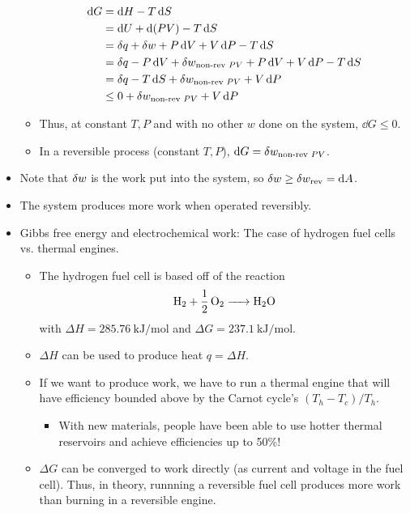 \documentclass[../notes.tex]{subfiles}
\begin{document}
\begin{itemize}
\begin{itemize}
        \begin{align*}
            \dd{G} &= \dd{H}-T\dd{S}\\
            &= \dd{U}+\dd{(PV)}-T\dd{S}\\
            &= \var{q}+\var{w}+P\dd{V}+V\dd{P}-T\dd{S}\\
            &= \var{q}-P\dd{V}+\var{w_{\text{non-rev }PV}}+P\dd{V}+V\dd{P}-T\dd{S}\\
            &= \var{q}-T\dd{S}+\var{w_{\text{non-rev }PV}}+V\dd{P}\\
            &\leq 0+\var{w_{\text{non-rev }PV}}+V\dd{P}
        \end{align*}
        \item Thus, at constant $T,P$ and with no other $w$ done on the system, $\dd{G}\leq 0$.
        \item In a reversible process (constant $T,P$), $\dd{G}=\var{w_{\text{non-rev }PV}}$.
    \end{itemize}
    \item Note that $\var{w}$ is the work put into the system, so $\var{w}\geq\var{w_\text{rev}}=\dd{A}$.
    \item The system produces more work when operated reversibly.
    \item Gibbs free energy and electrochemical work: The case of hydrogen fuel cells vs. thermal engines.
    \begin{itemize}
        \item The hydrogen fuel cell is based off of the reaction
        \begin{equation*}
            \ce{H2 + 1/2O2 -> H2O}
        \end{equation*}
        with $\Delta H=\SI[per-mode=symbol]{285.76}{\kilo\joule\per\mole}$ and $\Delta G=\SI[per-mode=symbol]{237.1}{\kilo\joule\per\mole}$.
        \item $\Delta H$ can be used to produce heat $q=\Delta H$.
        \item If we want to produce work, we have to run a thermal engine that will have efficiency bounded above by the Carnot cycle's $(T_h-T_c)/T_h$.
        \begin{itemize}
            \item With new materials, people have been able to use hotter thermal reservoirs and achieve efficiencies up to 50\%!
        \end{itemize}
        \item $\Delta G$ can be converged to work directly (as current and voltage in the fuel cell). Thus, in theory, runnning a reversible fuel cell produces more work than burning  in a reversible engine.

\end{itemize}
\end{itemize}
\end{document}
